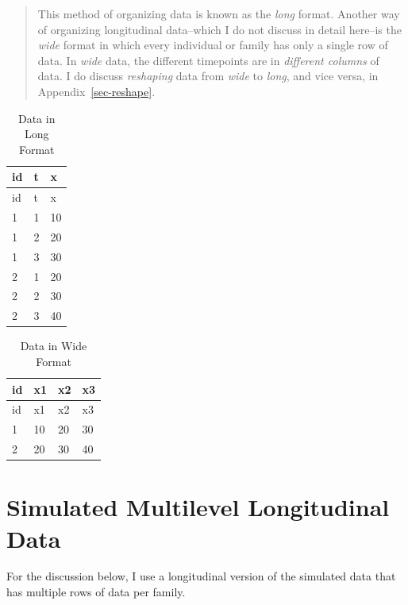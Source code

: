 \documentclass[
  letterpaper,
  DIV=11,
  numbers=noendperiod]{scrreprt}
\begin{document}
\begin{quote}
This method of organizing data is known as the \emph{long} format.
Another way of organizing longitudinal data--which I do not discuss in
detail here--is the \emph{wide} format in which every individual or
family has only a single row of data. In \emph{wide} data, the different
timepoints are in \emph{different columns} of data. I do discuss
\emph{reshaping} data from \emph{wide} to \emph{long}, and vice versa,
in Appendix~\ref{sec-reshape}.
\end{quote}

\hypertarget{tbl-datalong}{}
\begin{longtable}[]{@{}lll@{}}
\caption{\label{tbl-datalong}Data in Long Format}\tabularnewline
\toprule()
id & t & x \\
\midrule()
\endfirsthead
\toprule()
id & t & x \\
\midrule()
\endhead
1 & 1 & 10 \\
1 & 2 & 20 \\
1 & 3 & 30 \\
2 & 1 & 20 \\
2 & 2 & 30 \\
2 & 3 & 40 \\
\bottomrule()
\end{longtable}

\hypertarget{tbl-datawide}{}
\begin{longtable}[]{@{}llll@{}}
\caption{\label{tbl-datawide}Data in Wide Format}\tabularnewline
\toprule()
id & x1 & x2 & x3 \\
\midrule()
\endfirsthead
\toprule()
id & x1 & x2 & x3 \\
\midrule()
\endhead
1 & 10 & 20 & 30 \\
2 & 20 & 30 & 40 \\
\bottomrule()
\end{longtable}

\hypertarget{simulated-multilevel-longitudinal-data}{%
\section{Simulated Multilevel Longitudinal
Data}\label{simulated-multilevel-longitudinal-data}}

For the discussion below, I use a longitudinal version of the simulated
data that has multiple rows of data per family.
\end{document}
